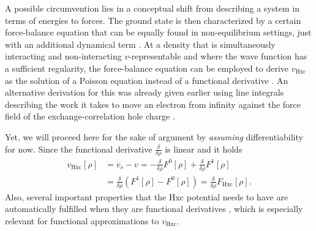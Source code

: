 \documentclass[journal=apcach,manuscript=article,layout=twocolumn]{achemso}
\newcommand{\vHxc}{v_\mathrm{Hxc}}
\newcommand{\FHxc}{F_\mathrm{Hxc}}
\newcommand{\der}{\frac{\delta}{\delta \rho}}
\begin{document}
A possible circumvention lies in a conceptual shift from describing a system in terms of energies to forces. The ground state is then characterized by a certain force-balance equation that can be equally found in non-equilibrium settings, just with an additional dynamical term \cite{tchenkoue2019force,stefanucci2013}. At a density that is simultaneously interacting and non-interacting $v$-representable and where the wave function has a sufficient regularity, the force-balance equation can be employed to derive $\vHxc$ as the solution of a Poisson equation instead of a functional derivative \cite{ruggenthaler2022force}. An alternative derivation for this was already given earlier using line integrals describing the work it takes to move an electron from infinity against the force field of the exchange-correlation hole charge \cite{harbola1991local,slamet1994force}.

Yet, we will proceed here for the sake of argument by \emph{assuming} differentiability for now. 
Since the functional derivative $\der$ is linear and it holds
\begin{equation}\label{eq:vxc-diff-F}
\begin{aligned}
    \vHxc[\rho] &= v_s-v = - \der F^0[\rho] +\der F^1[\rho]  \\
    &= \der (F^1[\rho] - F^0[\rho]) = \der\FHxc[\rho].
\end{aligned}
\end{equation}
Also, several important properties that the Hxc potential needs to have are automatically fulfilled when they are functional derivatives \cite{gaiduk2009potential_func_deriv}, which is especially relevant for functional approximations to $\vHxc$.
\end{document}

